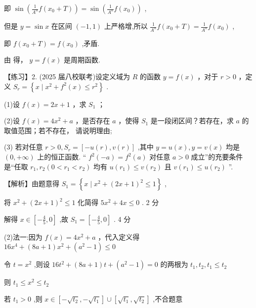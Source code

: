 \documentclass[10pt]{article}
\newcommand*\circled[1]{\tikz[baseline=(char.base)]{\node[shape=circle,draw,inner sep=1.5pt] (char) {\small #1};}}
\begin{document}
即 \(\sin \left( {\frac{1}{{A}^{n}}f\left( {{x}_{0} + T}\right) }\right)  = \sin \left( {\frac{1}{{A}^{n}}f\left( {x}_{0}\right) }\right)\) ,

但是 \(y = \sin x\) 在区间 \(\left( {-1,1}\right)\) 上严格增,所以 \(\frac{1}{{A}^{n}}f\left( {{x}_{0} + T}\right)  = \frac{1}{{A}^{n}}f\left( {x}_{0}\right)\) ,

即 \(f\left( {{x}_{0} + T}\right)  = f\left( {x}_{0}\right)\) ,矛盾.

由 \circled{1}  \circled{2} 得， \(y = f\left( x\right)\) 是周期函数.

【练习】2. (2025 届八校联考)设定义域为 \(R\) 的函数 \(y = f\left( x\right)\) ，对于 \(r > 0\) ，定义 \({S}_{r} = \left\{  {x \mid  {x}^{2} + {f}^{2}\left( x\right)  \leq  {r}^{2}}\right\}\) .

(1)设 \(f\left( x\right)  = {{2x} + 1}\) ，求 \({S}_{1}\) ；

(2)设 \(f\left( x\right)  = 4{x}^{2} + a\) ，是否存在 \(a\) ，使得 \({S}_{1}\) 是一段闭区间？若存在，求 \(a\) 的取值范围；若不存在， 请说明理由;

(3) 若对任意 \(r > 0,{S}_{r} = \left\lbrack  {-u\left( r\right) ,v\left( r\right) }\right\rbrack\) ,其中 \(y = u\left( x\right) ,y = v\left( x\right)\) 均是 \(\left( {0, + \infty }\right)\) 上的恒正函数. “ \({f}^{2}\left( {-a}\right)  = {f}^{2}\left( a\right)\) 对任意 \(a > 0\) 成立”的充要条件是“任取 \({r}_{1},{r}_{2}\left( {0 < {r}_{1} < {r}_{2}}\right)\) 均有 \(u\left( {r}_{1}\right)  \leq  v\left( {r}_{2}\right)\) 且 \(v\left( {r}_{1}\right)  \leq  u\left( {r}_{2}\right)\) ”.

【解析】由题意得 \({S}_{1} = \left\{  {x \mid  {x}^{2} + {\left( 2x + 1\right) }^{2} \leq  1}\right\}\) ,

将 \({x}^{2} + {\left( 2x + 1\right) }^{2} \leq  1\) 化简得 \(5{x}^{2} + {4x} \leq  0\) . 2 分

解得 \(x \in  \left\lbrack  {-\frac{4}{5},0}\right\rbrack\) ,故 \({S}_{1} = \left\lbrack  {-\frac{4}{5},0}\right\rbrack\) . 4 分

(2)法一:因为 \(f\left( x\right)  = 4{x}^{2} + a\) ，代入定义得 \({16}{x}^{4} + \left( {{8a} + 1}\right) {x}^{2} + \left( {{a}^{2} - 1}\right)  \leq  0\)

令 \(t = {x}^{2}\) ,则设 \({16}{t}^{2} + \left( {{8a} + 1}\right) t + \left( {{a}^{2} - 1}\right)  = 0\) 的两根为 \({t}_{1},{t}_{2},{t}_{1} \leq  {t}_{2}\)

则 \({t}_{1} \leq  {x}^{2} \leq  {t}_{2}\)

若 \({t}_{1} > 0\) ,则 \(x \in  \left\lbrack  {-\sqrt{{t}_{2}}, - \sqrt{{t}_{1}}}\right\rbrack   \cup  \left\lbrack  {\sqrt{{t}_{1}},\sqrt{{t}_{2}}}\right\rbrack\) ,不合题意
\end{document}
